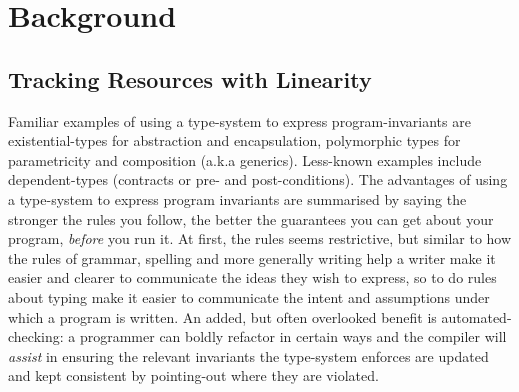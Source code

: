 \chapter{Background}

%

%

\section{Tracking Resources with Linearity}
Familiar examples of using a type-system to express program-invariants are
existential-types for abstraction and encapsulation, polymorphic types for
parametricity and composition (a.k.a generics). Less-known examples include
dependent-types (contracts or pre- and post-conditions). The advantages of
using a type-system to express program invariants are summarised by saying the
stronger the rules you follow, the better the guarantees you can get about your
program, \emph{before} you run it. At first, the rules seems restrictive, but
similar to how the rules of grammar, spelling and more generally writing help a
writer make it easier and clearer to communicate the ideas they wish to express,
so to do rules about typing make it easier to communicate the intent and
assumptions under which a program is written. An added, but often overlooked
benefit is automated-checking: a programmer can boldly refactor in certain
ways and the compiler will \emph{assist} in ensuring the relevant invariants
the type-system enforces are updated and kept consistent by pointing-out
where they are violated.

